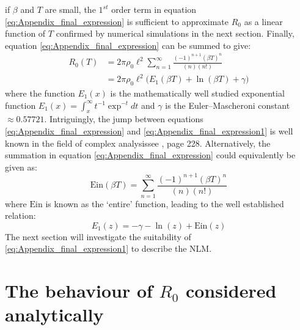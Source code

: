if $\beta$ and $T$ are small, the $1^{st}$ order term in equation \ref{eq:Appendix_final_expression} is sufficient to approximate $R_0$ as a linear function of $T$\textemdash
confirmed by numerical simulations in the next section. 
Finally, equation \ref{eq:Appendix_final_expression} can be summed to give:
\begin{equation} 
\label{eq:Appendix_final_expression1}
\begin{split}
R_0(T) & = 2\pi\rho_0 \ell^2 \sum^{\infty}_{n=1} \frac{(-1)^{n+1} (\beta T)^n}{(n)(n!)}\\
& =  2\pi\rho_0 \ell^2 \big(E_1(\beta T) + \ln (\beta T) + \gamma\big)
\end{split}
\end{equation}
where the function $E_1(x)$ is the mathematically well studied exponential function $E_1(x)=\int^{\infty}_x t^{-1}\exp^{-t}dt$ and $\gamma$ is the Euler–Mascheroni constant $\approx 0.57721$.
Intriguingly, the jump between equations \ref{eq:Appendix_final_expression} and \ref{eq:Appendix_final_expression1} is well known in the field of complex analysis\textemdash see \cite{abramowitz1948handbook}, page 228.
Alternatively, the summation in equation \ref{eq:Appendix_final_expression} could equivalently be given as:
\begin{equation}
\label{eq:ein}
     \mathrm{Ein}(\beta T) = \sum^{\infty}_{n=1} \frac{(-1)^{n+1} (\beta T)^n}{(n)(n!)}
\end{equation}
where $\mathrm{Ein}$ is known as the `entire' function, leading to the well established relation:
\[
E_1(z) = -\gamma - \ln(z) + \mathrm{Ein}(z)
\]
The next section will investigate the suitability of \ref{eq:Appendix_final_expression1} to describe the NLM.

\section{The behaviour of $R_0$ considered analytically}

